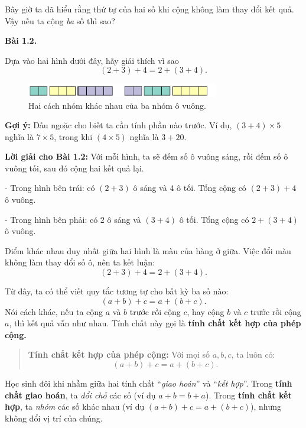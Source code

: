 \documentclass[12pt,a4paper]{book}
\newenvironment{problem}[1][]{
  \par\noindent\textbf{Bài #1.}\ \ignorespaces
}{\par}
\begin{document}
Bây giờ ta đã hiểu rằng thứ tự của hai số khi cộng không làm thay đổi kết quả.
Vậy nếu ta cộng \emph{ba} số thì sao?

\begin{problem}[1.2]
Dựa vào hai hình dưới đây, hãy giải thích vì sao
\[
(2 + 3) + 4 = 2 + (3 + 4).
\]

\begin{figure}[h!]
  \centering
  \includegraphics[width=0.75\textwidth]{img/fig-prob1.2-assoc.pdf}
  \caption*{\small Hai cách nhóm khác nhau của ba nhóm ô vuông.}
\end{figure}
\end{problem}

\noindent\textbf{Gợi ý:} Dấu ngoặc cho biết ta cần tính phần nào trước.
Ví dụ, $(3 + 4) \times 5$ nghĩa là $7 \times 5$, trong khi $(4 \times 5)$ nghĩa là $3 + 20$.


\textbf{Lời giải cho Bài 1.2:}  
Với mỗi hình, ta sẽ đếm số ô vuông sáng, rồi đếm số ô vuông tối, sau đó cộng hai kết quả lại.

- Trong hình bên trái: có $(2 + 3)$ ô sáng và $4$ ô tối.  
  Tổng cộng có $(2 + 3) + 4$ ô vuông.

- Trong hình bên phải: có $2$ ô sáng và $(3 + 4)$ ô tối.  
  Tổng cộng có $2 + (3 + 4)$ ô vuông.

Điểm khác nhau duy nhất giữa hai hình là màu của hàng ở giữa.  
Việc đổi màu không làm thay đổi số ô, nên ta kết luận:
\[
(2 + 3) + 4 = 2 + (3 + 4).
\]

Từ đây, ta có thể viết quy tắc tương tự cho bất kỳ ba số nào:
\[
(a + b) + c = a + (b + c).
\]
Nói cách khác, nếu ta cộng $a$ và $b$ trước rồi cộng $c$,  
hay cộng $b$ và $c$ trước rồi cộng $a$, thì kết quả vẫn như nhau.  
Tính chất này gọi là \textbf{tính chất kết hợp của phép cộng.}

\begin{quote}
\textbf{Tính chất kết hợp của phép cộng:}  
Với mọi số $a, b, c$, ta luôn có:
\[
(a + b) + c = a + (b + c).
\]
\end{quote}

\begin{tcolorbox}[colback=yellow!10!white,colframe=orange!80!black,title={Lưu ý quan trọng}]
Học sinh đôi khi nhầm giữa hai tính chất “\emph{giao hoán}” và “\emph{kết hợp}”.  
Trong \textbf{tính chất giao hoán}, ta \emph{đổi chỗ} các số (ví dụ $a+b=b+a$).  
Trong \textbf{tính chất kết hợp}, ta \emph{nhóm} các số khác nhau  
(ví dụ $(a+b)+c=a+(b+c)$), nhưng không đổi vị trí của chúng.
\end{tcolorbox}
\end{document}

